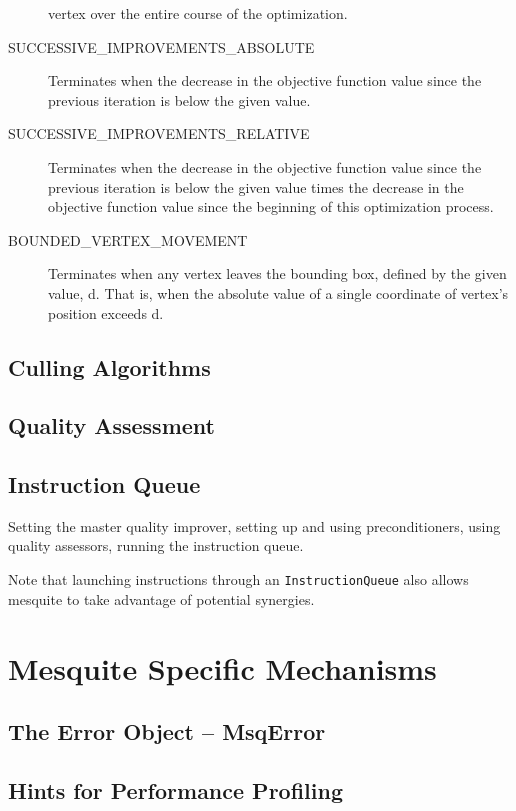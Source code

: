 \begin{description}
vertex over the entire course of the optimization. 
\item[SUCCESSIVE\_\-IMPROVEMENTS\_\-ABSOLUTE] Terminates when the decrease in the objective function
value since the previous iteration is below the given value.
\item[SUCCESSIVE\_\-IMPROVEMENTS\_\-RELATIVE] Terminates when the decrease in the objective function
value since the previous iteration is below the given value times the decrease in the objective
function value since the beginning of this optimization process. 
\item[BOUNDED\_\-VERTEX\_\-MOVEMENT] Terminates when any vertex leaves the bounding box, defined by the given value, d. That is, when
the absolute value of a single coordinate of vertex's position exceeds d. 
\end{description}


\subsection{Culling Algorithms}

\subsection{Quality Assessment}

\subsection{Instruction Queue}
Setting the master quality improver, setting up and using preconditioners,
using quality assessors, running the instruction queue.

Note that launching instructions through an \texttt{InstructionQueue} also allows mesquite to take
advantage of potential synergies. 


\section{Mesquite Specific Mechanisms}

\subsection{The Error Object -- MsqError}
\label{sec:MsqError}

\subsection{Hints for Performance Profiling}

